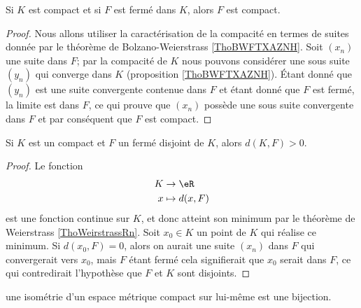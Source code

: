 \begin{lemma}   \label{LemnAeACf}
    Si \( K\) est compact et si \( F\) est fermé dans \( K\), alors \( F\) est compact.
\end{lemma}

\begin{proof}
    Nous allons utiliser la caractérisation de la compacité en termes de suites donnée par le théorème de Bolzano-Weierstrass \ref{ThoBWFTXAZNH}. Soit \( (x_n)\) une suite dans \( F\); par la compacité de \( K\) nous pouvons considérer une sous suite \( (y_n)\) qui converge dans \( K\) (proposition \ref{ThoBWFTXAZNH}). Étant donné que \( (y_n)\) est une suite convergente contenue dans \( F\) et étant donné que \( F\) est fermé, la limite est dans \( F\), ce qui prouve que \( (x_n)\) possède une sous suite convergente dans $F$ et par conséquent que \( F\) est compact.
\end{proof}

\begin{lemma}   \label{LemKIcAbic}
    Si \( K\) est un compact et \( F\) un fermé disjoint de \( K\), alors \( d(K,F)>0\).
\end{lemma}

\begin{proof}
    Le fonction 
    \begin{equation}
        \begin{aligned}
             K&\to \eR \\
            x&\mapsto d(x,F) 
        \end{aligned}
    \end{equation}
    est une fonction continue sur \( K\), et donc atteint son minimum par le théorème de Weierstrass \ref{ThoWeirstrassRn}. Soit \( x_0\in K\) un point de \( K\) qui réalise ce minimum. Si \( d(x_0,F)=0\), alors on aurait une suite \( (x_n)\) dans \( F\) qui convergerait vers \( x_0\), mais \( F\) étant fermé cela signifierait que \( x_0\) serait dans \( F\), ce qui contredirait l'hypothèse que \( F\) et \( K\) sont disjoints.
\end{proof}

\begin{proposition}
    une isométrie d'un espace métrique compact sur lui-même est une bijection.
\end{proposition}

